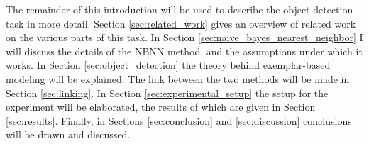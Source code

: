 The remainder of this introduction will be used to describe the object detection task in more detail. Section \ref{sec:related_work} gives an overview of related work on the various parts of this task. In Section \ref{sec:naive_bayes_nearest_neighbor} I will discuss the details of the NBNN method, and the assumptions under which it works. In Section \ref{sec:object_detection} the theory behind exemplar-based modeling will be explained. The link between the two methods will be made in Section \ref{sec:linking}. In Section \ref{sec:experimental_setup} the setup for the experiment will be elaborated, the results of which are given in Section \ref{sec:results}. Finally, in Sections \ref{sec:conclusion} and \ref{sec:discussion} conclusions will be drawn and discussed.

